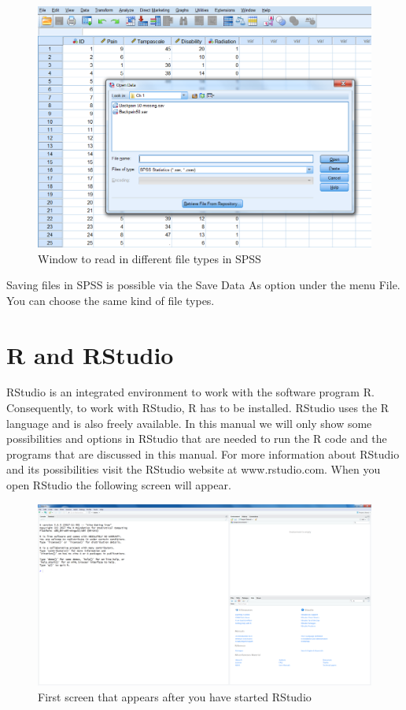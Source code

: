 \documentclass[]{book}
\theoremstyle{definition}
\theoremstyle{definition}
\theoremstyle{definition}
\theoremstyle{remark}
\begin{document}
\begin{figure}

{\centering \includegraphics[width=0.8\linewidth]{images/fig1.8} 

}

\caption{Window to read in different file types in SPSS}\label{fig:fig8}
\end{figure}

Saving files in SPSS is possible via the Save Data As option under the
menu File. You can choose the same kind of file types.

\section{R and RStudio}\label{r-and-rstudio}

RStudio is an integrated environment to work with the software program
R. Consequently, to work with RStudio, R has to be installed. RStudio
uses the R language and is also freely available. In this manual we will
only show some possibilities and options in RStudio that are needed to
run the R code and the programs that are discussed in this manual. For
more information about RStudio and its possibilities visit the RStudio
website at www.rstudio.com. When you open RStudio the following screen
will appear.

\begin{figure}

{\centering \includegraphics[width=0.8\linewidth]{images/fig1.10} 

}

\caption{First screen that appears after you have started RStudio}\label{fig:fig10}
\end{figure}
\end{document}
